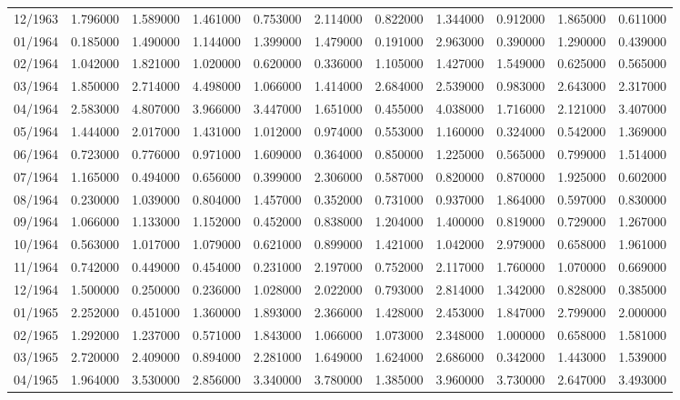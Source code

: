 \begin{tabular}{lrrrrrrrrrr}
12/1963 & 1.796000 & 1.589000 & 1.461000 & 0.753000 & 2.114000 & 0.822000 & 1.344000 & 0.912000 & 1.865000 & 0.611000 \\
01/1964 & 0.185000 & 1.490000 & 1.144000 & 1.399000 & 1.479000 & 0.191000 & 2.963000 & 0.390000 & 1.290000 & 0.439000 \\
02/1964 & 1.042000 & 1.821000 & 1.020000 & 0.620000 & 0.336000 & 1.105000 & 1.427000 & 1.549000 & 0.625000 & 0.565000 \\
03/1964 & 1.850000 & 2.714000 & 4.498000 & 1.066000 & 1.414000 & 2.684000 & 2.539000 & 0.983000 & 2.643000 & 2.317000 \\
04/1964 & 2.583000 & 4.807000 & 3.966000 & 3.447000 & 1.651000 & 0.455000 & 4.038000 & 1.716000 & 2.121000 & 3.407000 \\
05/1964 & 1.444000 & 2.017000 & 1.431000 & 1.012000 & 0.974000 & 0.553000 & 1.160000 & 0.324000 & 0.542000 & 1.369000 \\
06/1964 & 0.723000 & 0.776000 & 0.971000 & 1.609000 & 0.364000 & 0.850000 & 1.225000 & 0.565000 & 0.799000 & 1.514000 \\
07/1964 & 1.165000 & 0.494000 & 0.656000 & 0.399000 & 2.306000 & 0.587000 & 0.820000 & 0.870000 & 1.925000 & 0.602000 \\
08/1964 & 0.230000 & 1.039000 & 0.804000 & 1.457000 & 0.352000 & 0.731000 & 0.937000 & 1.864000 & 0.597000 & 0.830000 \\
09/1964 & 1.066000 & 1.133000 & 1.152000 & 0.452000 & 0.838000 & 1.204000 & 1.400000 & 0.819000 & 0.729000 & 1.267000 \\
10/1964 & 0.563000 & 1.017000 & 1.079000 & 0.621000 & 0.899000 & 1.421000 & 1.042000 & 2.979000 & 0.658000 & 1.961000 \\
11/1964 & 0.742000 & 0.449000 & 0.454000 & 0.231000 & 2.197000 & 0.752000 & 2.117000 & 1.760000 & 1.070000 & 0.669000 \\
12/1964 & 1.500000 & 0.250000 & 0.236000 & 1.028000 & 2.022000 & 0.793000 & 2.814000 & 1.342000 & 0.828000 & 0.385000 \\
01/1965 & 2.252000 & 0.451000 & 1.360000 & 1.893000 & 2.366000 & 1.428000 & 2.453000 & 1.847000 & 2.799000 & 2.000000 \\
02/1965 & 1.292000 & 1.237000 & 0.571000 & 1.843000 & 1.066000 & 1.073000 & 2.348000 & 1.000000 & 0.658000 & 1.581000 \\
03/1965 & 2.720000 & 2.409000 & 0.894000 & 2.281000 & 1.649000 & 1.624000 & 2.686000 & 0.342000 & 1.443000 & 1.539000 \\
04/1965 & 1.964000 & 3.530000 & 2.856000 & 3.340000 & 3.780000 & 1.385000 & 3.960000 & 3.730000 & 2.647000 & 3.493000 \\

\end{tabular}
